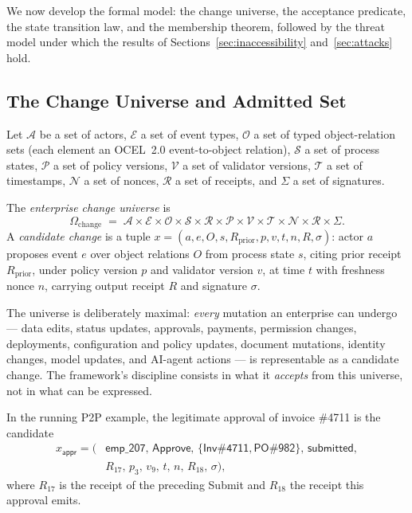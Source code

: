 We now develop the formal model: the change universe, the acceptance predicate,
the state transition law, and the membership theorem, followed by the threat
model under which the results of Sections~\ref{sec:inaccessibility}
and~\ref{sec:attacks} hold.

\subsection{The Change Universe and Admitted Set}

Let $\mathcal{A}$ be a set of actors, $\mathcal{E}$ a set of event types,
$\mathcal{O}$ a set of typed object-relation sets (each element an OCEL~2.0
event-to-object relation), $\mathcal{S}$ a set of process states, $\mathcal{P}$
a set of policy versions, $\mathcal{V}$ a set of validator versions,
$\mathcal{T}$ a set of timestamps, $\mathcal{N}$ a set of nonces, $\mathcal{R}$
a set of receipts, and $\Sigma$ a set of signatures.

\begin{definition}
\label{def:omega}
The \emph{enterprise change universe} is
\[
  \Omega_{\mathrm{change}} \;=\; \mathcal{A} \times \mathcal{E} \times
  \mathcal{O} \times \mathcal{S} \times \mathcal{R} \times \mathcal{P} \times
  \mathcal{V} \times \mathcal{T} \times \mathcal{N} \times \mathcal{R} \times
  \Sigma.
\]
A \emph{candidate change} is a tuple
$x = (a, e, O, s, R_{\mathrm{prior}}, p, v, t, n, R, \sigma)$: actor $a$
proposes event $e$ over object relations $O$ from process state $s$, citing
prior receipt $R_{\mathrm{prior}}$, under policy version $p$ and validator
version $v$, at time $t$ with freshness nonce $n$, carrying output receipt $R$
and signature $\sigma$.
\end{definition}

The universe is deliberately maximal: \emph{every} mutation an enterprise can
undergo --- data edits, status updates, approvals, payments, permission
changes, deployments, configuration and policy updates, document mutations,
identity changes, model updates, and AI-agent actions --- is representable as a
candidate change. The framework's discipline consists in what it
\emph{accepts} from this universe, not in what can be expressed.

In the running P2P example, the legitimate approval of invoice \#4711 is the
candidate
\begin{align*}
  x_{\textsf{appr}} = (&\textsf{emp\_207},\, \textsf{Approve},\,
  \{\textsf{Inv\#4711}, \textsf{PO\#982}\},\, \textsf{submitted},\\
  &R_{17},\, p_{3},\, v_{9},\, t,\, n,\, R_{18},\, \sigma),
\end{align*}
where $R_{17}$ is the receipt of the preceding \textsf{Submit} and $R_{18}$
the receipt this approval emits.

